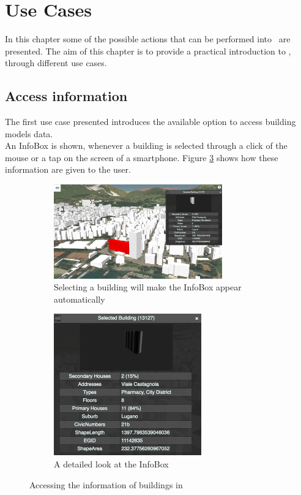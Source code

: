 \section{Use Cases} \label{useCases}
In this chapter some of the possible actions that can be performed into \applicationName\ are presented. The aim of this chapter is to provide a practical introduction to \applicationName, through different use cases.
\subsection{Access information}
The first use case presented introduces the available option to access building models data.\\
An InfoBox is shown, whenever a building is selected through a click of the mouse or a tap on the screen of a smartphone. Figure \ref{fig:infoBox} shows how these information are given to the user.
\begin{figure} [H]
\centering
\begin{subfigure}[b]{1\textwidth}
	\centering
	\includegraphics[width=0.8\textwidth]{chapter4/images/infoBox_city}
	\caption{Selecting a building will make the InfoBox appear automatically}
	\label{subfig:infoBox_city}
\end{subfigure}
\begin{subfigure}[b]{1\textwidth}
	\centering
	\includegraphics[width=0.7\textwidth]{chapter4/images/infoBox}
	\caption{A detailed look at the InfoBox}
	\label{subfig:infoBox}
\end{subfigure}
\caption{Accessing the information of buildings in \applicationName}
\label{fig:infoBox}
\end{figure}
